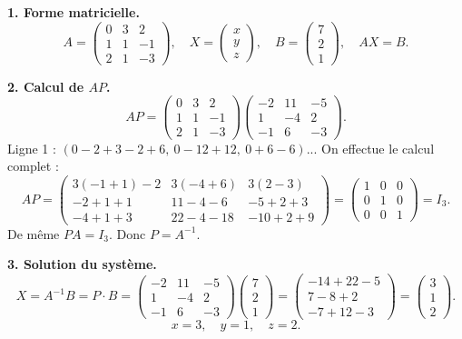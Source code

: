 \begin{solution}
	\textbf{1. Forme matricielle.}
	\[
	A = \begin{pmatrix}0&3&2\\1&1&-1\\2&1&-3\end{pmatrix}, \quad
	X = \begin{pmatrix}x\\y\\z\end{pmatrix}, \quad
	B = \begin{pmatrix}7\\2\\1\end{pmatrix}, \quad
	AX = B.
	\]
	
	\textbf{2. Calcul de $AP$.}
	\[
	AP =
	\begin{pmatrix}0&3&2\\1&1&-1\\2&1&-3\end{pmatrix}
	\begin{pmatrix}-2&11&-5\\1&-4&2\\-1&6&-3\end{pmatrix}.
	\]
	Ligne 1 : $(0-2+3-2+6,\ 0-12+12,\ 0+6-6)$... On effectue le calcul complet :
	\[
	AP = \begin{pmatrix}
		3(-1+1)-2 & 3(-4+6) & 3(2-3) \\
		-2+1+1 & 11-4-6 & -5+2+3 \\
		-4+1+3 & 22-4-18 & -10+2+9
	\end{pmatrix}
	= \begin{pmatrix}1&0&0\\0&1&0\\0&0&1\end{pmatrix} = I_3.
	\]
	De même $PA = I_3$. Donc $P = A^{-1}$.
	
	\textbf{3. Solution du système.}
	\[
	X = A^{-1}B = P\cdot B
	= \begin{pmatrix}-2&11&-5\\1&-4&2\\-1&6&-3\end{pmatrix}
	\begin{pmatrix}7\\2\\1\end{pmatrix}
	= \begin{pmatrix}-14+22-5\\7-8+2\\-7+12-3\end{pmatrix}
	= \begin{pmatrix}3\\1\\2\end{pmatrix}.
	\]
	\[
	\boxed{x = 3, \quad y = 1, \quad z = 2.}
	\]
\end{solution}